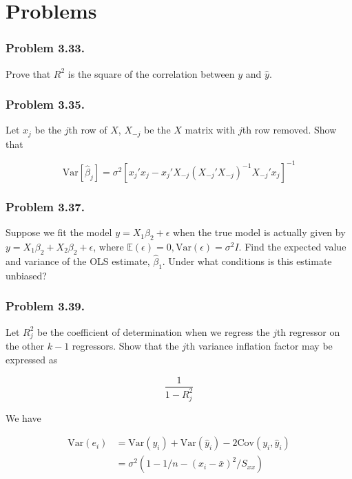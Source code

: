\documentclass[12pt]{article}
\begin{document}
\section*{Problems}
\subsubsection*{Problem 3.33.} Prove that $R^2$ is the square of the correlation between $y$ and $\hat{y}$.
\bigskip


\subsubsection*{Problem 3.35.} Let $x_j$ be the $j$th row of $X$, $X_{-j}$ be the $X$ matrix with $j$th row removed. Show that 

$$
\mathrm{Var}[\hat{\beta}_j] = \sigma^2 [x_j' x_j - x_j' X_{-j} (X_{-j}' X_{-j} )^{-1} X_{-j}' x_j  ]^{-1}
$$

\bigskip

\subsubsection*{Problem 3.37.} Suppose we fit the model $y = X_1 \beta_2 + \epsilon$ when the true model is actually given by $y = X_1 \beta_2 + X_2 \beta_2 + \epsilon$, where $\mathbb{E}(\epsilon) = 0, \mathrm{Var}(\epsilon) = \sigma^2 I $. Find the expected value and variance of the OLS estimate, $\hat{\beta}_1$. Under what conditions is this estimate unbiased?

\bigskip

\subsubsection*{Problem 3.39.} Let $R_j^2$ be the coefficient of determination when we regress the $j$th regressor on the other $k-1$ regressors. Show that the $j$th variance inflation factor may be expressed as 

$$
\frac{1}{1-R_j^2}
$$

\bigskip

We have

$$
\begin{aligned}
\mathrm{Var}(e_i) &= \mathrm{Var}(y_i) + \mathrm{Var}(\hat{y}_i) - 2 \mathrm{Cov}(y_i, \hat{y}_i) \\[8pt]
&= \sigma^2 (1 - 1/n - (x_i - \bar{x})^2/S_{xx})
\end{aligned}
$$
\end{document}
